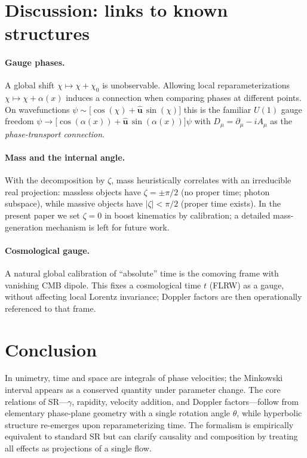 \documentclass[11pt]{article}
\numberwithin{equation}{section}
\providecommand{\uhat}{\hat{\mathbf u}}
\begin{document}
\section{Discussion: links to known structures}
\paragraph{Gauge phases.} A global shift $\chi\mapsto\chi+\chi_0$ is unobservable. Allowing local reparameterizations $\chi\mapsto\chi+\alpha(x)$ induces a connection when comparing phases at different points. On wavefunctions $\psi\sim \bigl[\cos(\chi)+\uhat\,\sin(\chi)\bigr]$ this is the familiar $U(1)$ gauge freedom $\psi\to \bigl[\cos(\alpha(x))+\uhat\,\sin(\alpha(x))\bigr]\psi$ with $D_\mu=\partial_\mu-iA_\mu$ as the \emph{phase-transport connection}.

\paragraph{Mass and the internal angle.} With the decomposition by $\zeta$, mass heuristically correlates with an irreducible real projection: massless objects have $\zeta=\pm\pi/2$ (no proper time; photon subspace), while massive objects have $|\zeta|<\pi/2$ (proper time exists). In the present paper we set $\zeta=0$ in boost kinematics by calibration; a detailed mass-generation mechanism is left for future work.

\paragraph{Cosmological gauge.} A natural global calibration of ``absolute'' time is the comoving frame with vanishing CMB dipole. This fixes a cosmological time $t$ (FLRW) as a gauge, without affecting local Lorentz invariance; Doppler factors are then operationally referenced to that frame.

\section{Conclusion}
In unimetry, time and space are integrals of phase velocities; the Minkowski interval appears as a conserved quantity under parameter change. The core relations of SR---$\gamma$, rapidity, velocity addition, and Doppler factors---follow from elementary phase-plane geometry with a single rotation angle $\theta$, while hyperbolic structure re-emerges upon reparameterizing time. The formalism is empirically equivalent to standard SR but can clarify causality and composition by treating all effects as projections of a single flow.
\end{document}
